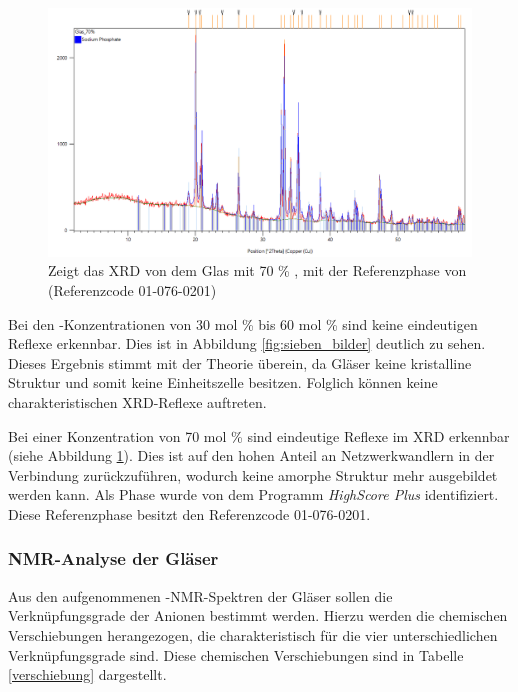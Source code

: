 \documentclass[12pt, a4paper]{article}
\begin{document}
\begin{figure}[!h]
  \centering
  \includegraphics[width=0.90\linewidth]{70pro.png}
  \caption{Zeigt das XRD von dem Glas mit 70 \% , mit der Referenzphase von  (Referenzcode 01-076-0201)}
    \label{70pro}
\end{figure}

\noindent
Bei den -Konzentrationen von 30 mol \% bis 60 mol \% sind keine eindeutigen Reflexe erkennbar. Dies ist in Abbildung \ref{fig:sieben_bilder} deutlich zu sehen. Dieses Ergebnis stimmt mit der Theorie überein, da Gläser keine kristalline Struktur und somit keine Einheitszelle besitzen. Folglich können keine charakteristischen XRD-Reflexe auftreten.


\noindent
Bei einer Konzentration von 70 mol \%  sind eindeutige Reflexe im XRD erkennbar (siehe Abbildung \ref{70pro}). 
Dies ist auf den hohen Anteil an Netzwerkwandlern in der Verbindung zurückzuführen, wodurch keine amorphe Struktur mehr ausgebildet werden kann.
Als Phase wurde von dem Programm \textit{HighScore Plus}  identifiziert. Diese Referenzphase besitzt den Referenzcode 01-076-0201.

\subsubsection{NMR-Analyse der Gläser}
Aus den aufgenommenen -NMR-Spektren der Gläser sollen die Verknüpfungsgrade der  Anionen bestimmt werden. Hierzu werden die chemischen Verschiebungen herangezogen, die charakteristisch für die vier unterschiedlichen Verknüpfungsgrade sind. Diese chemischen Verschiebungen sind in Tabelle \ref{verschiebung} dargestellt.

\renewcommand{\arraystretch}{1.3} %
\end{document}
